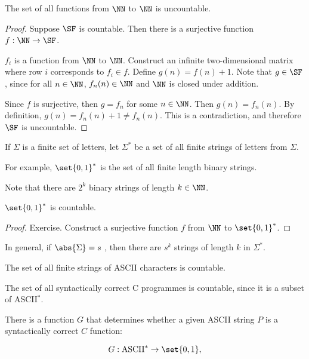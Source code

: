 \documentclass[11pt]{scrartcl}
\begin{document}
\begin{theorem}
The set of all functions from $\NN$ to $\NN$ is uncountable.
\end{theorem}

\begin{proof}
  \hfill

  Suppose $\SF$ is countable. Then there is a surjective function $f: \NN\to\SF$.

  $f_i$ is a function from $\NN$ to $\NN$. Construct an infinite two-dimensional matrix where row $i$ corresponds to $f_i\in f$. Define $g(n) = f(n) + 1$. Note that $g\in \SF$, since for all $n\in\NN$, $f_n(n) \in\NN$ and $\NN$ is closed under addition.

  Since $f$ is surjective, then $g = f_n$ for some $n\in\NN$. Then
  $g(n) = f_n(n)$. By definition, $g(n) = f_n(n)+1\neq f_n(n)$. This
  is a contradiction, and therefore $\SF$ is uncountable.
\end{proof}

If $\Sigma$ is a finite set of letters, let $\Sigma^{*}$ be a set of all finite strings of letters from $\Sigma$.

For example, $\set{0, 1}^{*}$ is the set of all finite length binary strings.

Note that there are $2^k$ binary strings of length $k\in\NN$.

\begin{theorem}
  $\set{0, 1}^{*}$ is countable.
\end{theorem}

\begin{proof}
  \hfill

Exercise. Construct a surjective function $f$ from $\NN$ to $\set{0, 1}^{*}$.
\end{proof}

In general, if $\abs{\Sigma} = s$ , then there are $s^k$ strings of length $k$ in $\Sigma^{*}$.

The set of all finite strings of ASCII characters is countable.
\begin{example}

The set of all syntactically correct C programmes is countable, since it is a subset of ASCII$^{*}$.

\end{example}

There is a function $G$ that determines whether a given ASCII string $P$ is a syntactically correct $C$ function:


\begin{equation}
  G: \text{ASCII}^{*} \to \set{0, 1},
\end{equation}
\end{document}

